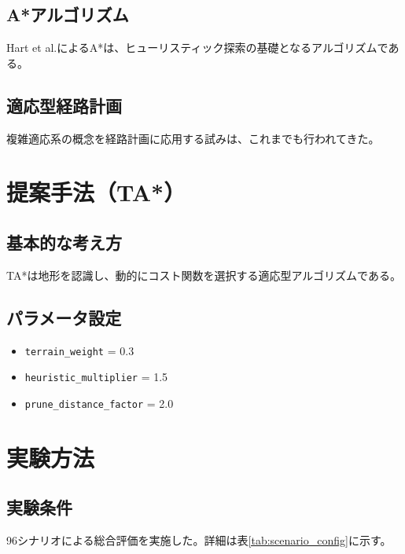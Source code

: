 \documentclass[12pt,a4paper]{article}
\begin{document}
\subsection{A*アルゴリズム}

Hart et al.\cite{hart1968}によるA*は、ヒューリスティック探索の基礎となるアルゴリズムである。

\subsection{適応型経路計画}

複雑適応系の概念を経路計画に応用する試みは、これまでも行われてきた。

\section{提案手法（TA*）}

\subsection{基本的な考え方}

TA*は地形を認識し、動的にコスト関数を選択する適応型アルゴリズムである。

\subsection{パラメータ設定}

\begin{itemize}
    \item \texttt{terrain\_weight} = 0.3
    \item \texttt{heuristic\_multiplier} = 1.5
    \item \texttt{prune\_distance\_factor} = 2.0
\end{itemize}

\section{実験方法}

\subsection{実験条件}

96シナリオによる総合評価を実施した。詳細は表\ref{tab:scenario_config}に示す。
\end{document}

